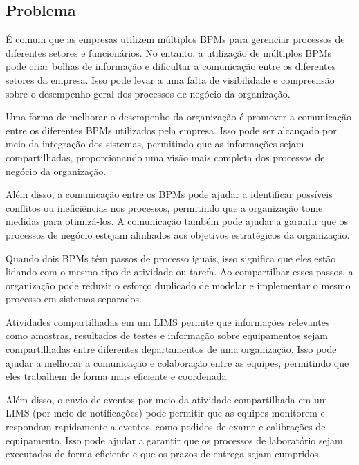 \subsection{Problema}

É comum que as empresas utilizem múltiplos BPMs para gerenciar processos de diferentes setores e funcionários.
No entanto, a utilização de múltiplos BPMs pode criar bolhas de informação e dificultar a comunicação entre os diferentes setores da empresa. Isso pode levar a uma falta de visibilidade e compreensão sobre o desempenho geral dos processos de negócio da organização.

Uma forma de melhorar o desempenho da organização é promover a comunicação entre os diferentes BPMs utilizados pela empresa. Isso pode ser alcançado por meio da integração dos sistemas, permitindo que as informações sejam compartilhadas, proporcionando uma visão mais completa dos processos de negócio da organização.

Além disso, a comunicação entre os BPMs pode ajudar a identificar possíveis conflitos ou ineficiências nos processos, permitindo que a organização tome medidas para otimizá-los. A comunicação também pode ajudar a garantir que os processos de negócio estejam alinhados aos objetivos estratégicos da organização.

Quando dois BPMs têm passos de processo iguais, isso significa que eles estão lidando com o mesmo tipo de atividade ou tarefa. Ao compartilhar esses passos, a organização pode reduzir o esforço duplicado de modelar e implementar o mesmo processo em sistemas separados.

Atividades compartilhadas em um LIMS permite que informações relevantes como amostras, resultados de testes e informação sobre equipamentos sejam compartilhadas entre diferentes departamentos de uma organização. Isso pode ajudar a melhorar a comunicação e colaboração entre as equipes, permitindo que eles trabalhem de forma mais eficiente e coordenada.

Além disso, o envio de eventos por meio da atividade compartilhada em um LIMS (por meio de notificações) pode permitir que as equipes monitorem e respondam rapidamente a eventos, como pedidos de exame e calibrações de equipamento. Isso pode ajudar a garantir que os processos de laboratório sejam executados de forma eficiente e que os prazos de entrega sejam cumpridos.